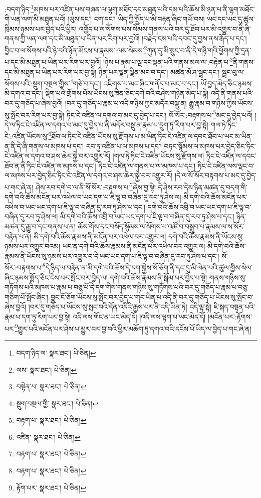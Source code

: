 :བདག་ཉིད་\footnote{བདག་ཉིད་ལ་  སྣར་ཐང་།  པེ་ཅིན། }མཁས་པར་འཛིན་པས་གཞན་ལ་ལྷག་མཐོང་དང་མཐུན་པའི་དམ་པའི་ཆོས་མི་ཉན་པ་ནི་ལྷག་མཐོང་གི་ཡན་ལག་མི་མཐུན་པའོ། །ལུས་དང་། ངག་དང་། ཡིད་ཀྱི་སྤྱོད་པ་མི་བརྟན་ཞིང་གཡོ་བས། ཡང་དང་ཡང་དུ་ཚུལ་ཁྲིམས་ཉམས་པར་བྱེད་པའི་ཕྱིར། འགྱོད་པ་ལ་སོགས་པས་སེམས་གནས་པའི་བར་དུ་ཐོབ་པར་མི་འགྱུར་བ་ནི་ཞི་གནས་ཀྱི་ཡན་ལག་དང་མི་མཐུན་པ་ཡིན་པར་རིག་པར་བྱའོ། །བརྗེད་ངས་པའི་དབང་དུ་བྱས་ནས་རྒོད་པ་དང་། བྱིང་བ་ལ་སོགས་པའི་ཉེ་བའི་ཉོན་མོངས་པ་རྣམས་:ལས་སེམས་\footnote{ལས་  སྣར་ཐང་།  པེ་ཅིན། }ཀུན་དུ་མི་སྲུང་བ་ནི་དེ་གཉི་གའི་ཕྱོགས་ཀྱི་དྲན་པ་དང་མི་མཐུན་པ་ཡིན་པར་རིག་པར་བྱའོ། །ཉེས་པ་རྣམ་པ་ལྔ་དང་ལྡན་པའི་གནས་མལ་ལ་:བརྟེན་པ་\footnote{བསྟེན་པ་  སྣར་ཐང་།  པེ་ཅིན། }ནི་གནས་དང་མི་མཐུན་པ་ཡིན་པར་རིག་པར་བྱ་སྟེ། ཉིན་པར་ལྗན་ལྗིན་མང་བ་དང་། མཚན་མོ་ཤ་སྦྲང་དང་། སྦྲང་བུ་ལ་སོགས་པའི་:སྡུག་བསྔལ་གྱིས་\footnote{སྡུག་བསྔལ་གྱི་  སྣར་ཐང་།  པེ་ཅིན། }གཙེ་བ་དང་། འཇིགས་པ་མང་ཞིང་གནོད་པ་མང་བ་དང་། ཡོ་བྱད་མེད་ཅིང་ཉམས་མི་དགའ་བ་དང་། སྡིག་པའི་གྲོགས་པོས་ཡོངས་སུ་ཟིན་ཅིང་དགེ་བའི་བཤེས་གཉེན་མེད་པ་སྟེ། འདི་ནི་གནས་པའི་བར་དུ་གཅོད་པ་ཞེས་བྱའོ། །བར་དུ་གཅོད་པ་རྣམ་པ་འདི་གཉིས་ཀྱང་མདོར་བསྡུ་ན། རྒྱུ་རྣམ་བ་གཉིས་ཀྱིས་ཡོངས་སུ་སྤོང་བར་རིག་པར་བྱ་སྟེ། ཏིང་ངེ་འཛིན་ལ་དགའ་བ་མང་དུ་བྱེད་པ་དང་། སོ་སོར་:བརྟགས་པ་\footnote{བརྟག་པ་  སྣར་ཐང་།  པེ་ཅིན། }མང་དུ་བྱེད་པའོ། །དེ་ལ་ཏིང་ངེ་འཛིན་ལ་དགའ་བ་མང་དུ་བྱེད་པ་ནི་མདོར་བསྡུ་ན་རྣམ་པ་དྲུག་ཏུ་རིག་པར་བྱ་སྟེ། གལ་ཏེ་ཏིང་ངེ་:འཛིན་ཡོངས་སུ་\footnote{འཛིན་  སྣར་ཐང་།  པེ་ཅིན། }ཐོབ་ལ་ཏིང་ངེ་འཛིན་ཡོངས་སུ་རྫོགས་པ་མ་ཡིན་ཏིང་ངེ་འཛིན་ལ་དབང་ཐོབ་པ་ཡང་མ་ཡིན་ན་ནི་དེ་ཞི་གནས་ལ་མཁས་པ་དང་། རབ་ཏུ་འཛིན་པ་ལ་མཁས་པ་དང་། བཏང་སྙོམས་ལ་མཁས་པར་བྱེད་ཅིང་ཏིང་ངེ་འཛིན་ལ་དགའ་བ་ཤས་ཆེར་སྐྱེ་བར་འགྱུར་རོ། །གལ་ཏེ་ཏིང་ངེ་འཛིན་ཡོངས་སུ་རྫོགས་ལ། ཏིང་ངེ་འཛིན་ལ་དབང་ཐོབ་ན་ནི་ཏིང་ངེ་འཛིན་ལ་མཁས་པ་དང་། ཏིང་ངེ་འཛིན་ལ་གནས་པ་ལ་མཁས་པ་དང་། ཏིང་ངེ་འཛིན་ལས་ལྡང་བ་ལ་མཁས་པར་བྱེད་ཅིང་ཏིང་ངེ་འཛིན་ལ་དགའ་བ་ཤས་ཆེར་སྐྱེ་བར་འགྱུར་རོ། །དེ་ལ་སོ་སོར་བརྟགས་པ་མང་དུ་བྱེད་པ་གང་ཞེ་ན། ཤེས་རབ་དགེ་བ་ལ་ནི་སོ་སོར་:བརྟགས་པ་\footnote{བརྟག་པ་  སྣར་ཐང་།  པེ་ཅིན། }ཞེས་བྱ་སྟེ། དེ་ཤེས་རབ་དེས་ཉིན་མཚན་དུ་བདག་གི་དགེ་བའི་ཆོས་མངོན་པར་འཕེལ་བ་ཡང་དག་པ་ཇི་ལྟ་བ་བཞིན་དུ་རབ་ཏུ་ཤེས་ལ། མི་དགེ་བའི་ཆོས་མངོན་པར་འཕེལ་བ་ཡང་ཡང་དག་པ་ཇི་ལྟ་བ་བཞིན་དུ་རབ་ཏུ་ཤེས་པ་དང་། དགེ་བའི་ཆོས་འབྲི་བ་ཡང་ཡང་དག་པ་ཇི་ལྟ་བ་བཞིན་དུ་རབ་ཏུ་ཤེས་ལ། མི་དགེ་བའི་ཆོས་འབྲི་བ་ཡང་ཡང་དག་པ་ཇི་ལྟ་བ་བཞིན་དུ་རབ་ཏུ་ཤེས་པ་དང་། ཉིན་མཚན་དུ་རྒྱུ་བ་དང་གནས་པ་ན། ཆོས་གོས་དང་བསོད་སྙོམས་ལ་སོགས་པ་འཚོ་བ་བསྒྲུབ་པ་རྣམས་ལ་ས་སོར་བརྟེན་པ་ན། མི་དགེ་བའི་ཆོས་རྣམས་ནི་མངོན་པར་འཕེལ་བར་འགྱུར་ལ། དགེ་བའི་ཆོས་རྣམས་ནི་ཡོངས་སུ་ཉམས་པར་འགྱུར་བའམ། ཡང་ན་དགེ་བའི་ཆོས་རྣམས་ནི་མངོན་པར་འཕེལ་བར་འགྱུར་ལ། མི་དགེ་བའི་ཆོས་རྣམས་ནི་ཡོངས་སུ་ཉམས་པར་འགྱུར་བ་དེ་ཡང་ཡང་དག་པ་ཇི་ལྟ་བ་བཞིན་དུ་རབ་ཏུ་ཤེས་པ་དང་། སོ་སོར་:བརྟགས་པ་\footnote{བརྟག་པ་  སྣར་ཐང་།  པེ་ཅིན། }དེ་ཉིད་ལ་བརྟེན་ན་མི་དགེ་བའི་ཆོས་དེ་དག་སྐྱེས་སོ་ཅོག་ནི་དང་དུ་མི་ལེན་པའི་ཚུལ་གྱིས་སེལ་ཞིང་ཉམས་སྨོད་ཅིང་ངེས་པར་སྤོང་བར་བྱེད་ལ། དགེ་བའི་ཆོས་རྣམས་ནི་སྒོམ་པར་བྱེད་པ་སྟེ། གནས་གཉིས་སུ་གཏོགས་པའི་མཁས་པ་རྣམ་པ་བཅུ་པོ་དེ་དག་གིས་གནས་གཉིས་སུ་གཏོགས་པའི་བར་དུ་གཅོད་པ་རྣམ་པ་བཅུ་གཅིག་པོ་སྤོང་ཞིང་། བྱུང་ངོ་ཅོག་ཡོངས་སུ་སྤོང་བར་བྱེད་པ་གང་ཡིན་པ་འདི་ནི་བར་དུ་གཅོད་པ་ཡོངས་སུ་སྤོང་བ་ཞེས་བྱའོ། །བར་དུ་གཅོད་པ་ཡོངས་སུ་སྤང་བའི་དོན་འདིའི་རྒྱས་པར་ནི་འདི་ཡིན་ཏེ། འདི་ལྟ་སྟེ། ཇི་སྐད་བསྟན་པའི་རྣམ་པ་དག་ཏུ་རིག་པར་བྱ་སྟེ། འདི་ལས་གོང་ན་ཡང་མེད་དོ། །འདི་ལས་ལྷག་པ་ཡང་མེད་དོ། །མངོན་པར་:རྟོགས་པར་\footnote{རྟོག་པར་  སྣར་ཐང་།  པེ་ཅིན། }གྱུར་པའི་མངོན་པར་ཤེས་པ་མྱུར་བར་བྱ་བའི་ཕྱིར་མཆོག་ཏུ་དགའ་བའི་དངོས་པོ་ཡིད་ལ་བྱེད་པ་གང་ཞེ་ན། 